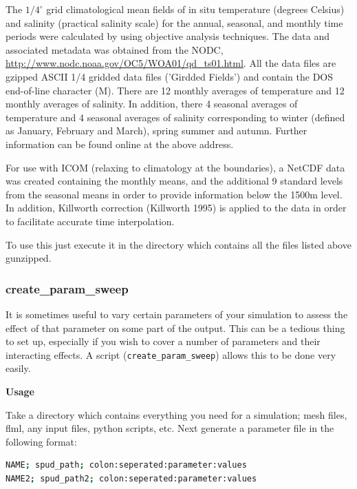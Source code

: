 The $1/4 ^\circ$ grid climatological mean fields of in situ temperature (degrees Celsius) and salinity (practical salinity scale) for the annual, seasonal, and monthly time periods were calculated by \cite{boyer2005} using objective analysis techniques. The data and associated metadata was obtained from the NODC, \url{http://www.nodc.noaa.gov/OC5/WOA01/qd_ts01.html}. All the data files are gzipped ASCII 1/4 gridded data files ('Girdded Fields') and contain the DOS end-of-line character (M). There are 12 monthly averages of temperature and 12 monthly averages of salinity. In addition, there 4 seasonal averages of temperature and 4 seasonal averages of salinity corresponding to winter (defined as January, February and March), spring summer and autumn. Further information can be found online at the above address.

For use with ICOM (relaxing to climatology at the boundaries), a NetCDF data was created containing the monthly means, and the additional 9 standard levels from the seasonal means in order to provide information below the 1500m level. In addition, Killworth correction (Killworth 1995) is applied to the data in order to facilitate accurate time interpolation.

To use this just execute it in the directory which contains all the files listed above gunzipped.

\subsubsection{create\_param\_sweep}
\label{sec:create_param_sweep}

It is sometimes useful to vary certain parameters of your simulation to assess the effect of
that parameter on some part of the output. This can be a tedious thing to set up, especially
if you wish to cover a number of parameters and their interacting effects.
A script (\lstinline[language = Bash]+create_param_sweep+) allows this to be done very easily.

\textbf{Usage}

Take a directory which contains everything you need for a simulation; mesh files,
flml, any input files, python scripts, etc. Next generate a parameter file in the following format:

\begin{lstlisting}[language = Bash]
NAME; spud_path; colon:seperated:parameter:values
NAME2; spud_path2; colon:seperated:parameter:values
\end{lstlisting}

